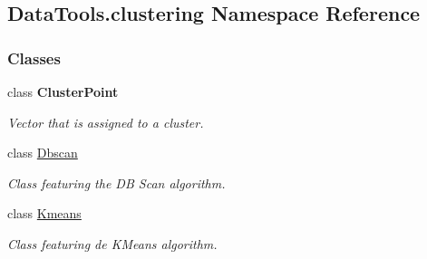 \hypertarget{namespaceDataTools_1_1clustering}{}\subsection{Data\+Tools.\+clustering Namespace Reference}
\label{namespaceDataTools_1_1clustering}
\subsubsection*{Classes}
\begin{DoxyCompactItemize}
\item 
class {\bfseries Cluster\+Point}
\begin{DoxyCompactList}\small\item\em Vector that is assigned to a cluster. \end{DoxyCompactList}\item 
class \hyperlink{classDataTools_1_1clustering_1_1Dbscan}{Dbscan}
\begin{DoxyCompactList}\small\item\em Class featuring the DB Scan algorithm. \end{DoxyCompactList}\item 
class \hyperlink{classDataTools_1_1clustering_1_1Kmeans}{Kmeans}
\begin{DoxyCompactList}\small\item\em Class featuring de K\+Means algorithm. \end{DoxyCompactList}\end{DoxyCompactItemize}
